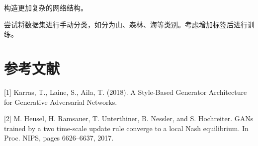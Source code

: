 \documentclass{article}
\begin{document}
\begin{CJK*}{UTF8}{gbsn}
构造更加复杂的网络结构。

尝试将数据集进行手动分类，如分为山、森林、海等类别。考虑增加标签后进行训练。

\section*{参考文献}

\small

[1] Karras, T., Laine, S., Aila, T. (2018). A Style-Based Generator Architecture for Generative Adversarial Networks. 

[2] M. Heusel, H. Ramsauer, T. Unterthiner, B. Nessler, and S. Hochreiter. GANs trained by a two time-scale update rule converge to a local Nash equilibrium. In Proc. NIPS, pages 6626–6637, 2017.


\end{CJK*}
\end{document}
